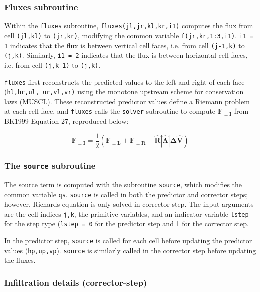 \documentclass{article}
\newcommand{\code}[1]{\texttt{#1}}
\begin{document}
\subsubsection*{Fluxes subroutine}

Within the \code{fluxes} subroutine, \code{fluxes(jl,jr,kl,kr,i1)} computes the flux from cell \code{(jl,kl)} to \code{(jr,kr)}, modifying the common variable \code{f(jr,kr,1:3,i1)}. 
\code{i1 = 1} indicates that the flux is between vertical cell faces, i.e. from cell \code{(j-1,k)} to \code{(j,k)}.
Similarly, \code{i1 = 2} indicates that the flux is between horizontal cell faces, i.e. from cell \code{(j,k-1)} to \code{(j,k)}.

 
\code{fluxes}  first reconstructs the predicted values to the left and right of each face (\code{hl,hr,ul, ur,vl,vr)} using the monotone upstream scheme for conservation laws (MUSCL).  These reconstructed predictor values define a Riemann problem at each cell face, and \code{fluxes} calls the \code{solver} subroutine to compute $\mathbf{F_{\perp I}}$ from BK1999 Equation 27, reproduced below:

\begin{equation*}
\mathbf{F_{\perp I}} =
	 \frac{1}{2} (\mathbf{F_{\perp L}} + \mathbf{F_{\perp R}} - \mathbf{\hat{R} |\hat{\Lambda}| \Delta \hat V  })
\end{equation*}


\subsubsection*{The \code{source} subroutine}

 The source term is computed with the subroutine \code{source}, which modifies the common variable \code{qs}.
  \code{source} is called in both the predictor and corrector steps; however, Richards equation is only solved in corrector step. 
 The input arguments are the  cell indices \code{j,k}, the primitive variables, and an indicator variable \code{lstep} for the step type (\code{lstep = 0} for the predictor step and 1 for the corrector step.		
 
In the predictor step, \code{source} is called for each cell before updating the predictor values (\code{hp,up,vp}).  \code{source} is similarly  called in the corrector step before updating the fluxes.

\subsubsection*{Infiltration details (corrector-step)}
\end{document}
